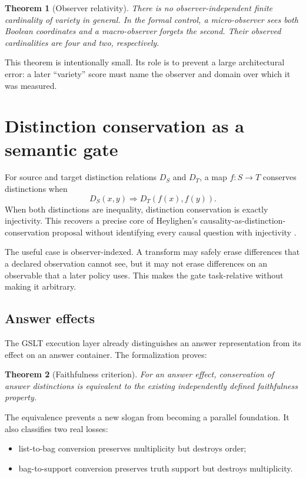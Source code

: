 \documentclass[11pt]{article}
\newtheorem{theorem}{Theorem}[section]
\begin{document}
\begin{theorem}[Observer relativity]
There is no observer-independent finite cardinality of variety in general.  In the
formal control, a micro-observer sees both Boolean coordinates and a macro-observer
forgets the second.  Their observed cardinalities are four and two, respectively.
\end{theorem}

This theorem is intentionally small.  Its role is to prevent a large architectural
error: a later ``variety'' score must name the observer and domain over which it was
measured.

\section{Distinction conservation as a semantic gate}

For source and target distinction relations $D_S$ and $D_T$, a map $f:S\to T$
conserves distinctions when
\[
  D_S(x,y) \Longrightarrow D_T(f(x),f(y)).
\]
When both distinctions are inequality, distinction conservation is exactly
injectivity.  This recovers a precise core of Heylighen's causality-as-distinction-
conservation proposal without identifying every causal question with injectivity
\cite{heylighen1989}.

The useful case is observer-indexed.  A transform may safely erase differences that
a declared observation cannot see, but it may not erase differences on an observable
that a later policy uses.  This makes the gate task-relative without making it
arbitrary.

\subsection{Answer effects}

The GSLT execution layer already distinguishes an answer representation from its
effect on an answer container.  The formalization proves:

\begin{theorem}[Faithfulness criterion]
For an answer effect, conservation of answer distinctions is equivalent to the
existing independently defined faithfulness property.
\end{theorem}

The equivalence prevents a new slogan from becoming a parallel foundation.  It also
classifies two real losses:

\begin{itemize}
\item list-to-bag conversion preserves multiplicity but destroys order;
\item bag-to-support conversion preserves truth support but destroys multiplicity.
\end{itemize}
\end{document}
